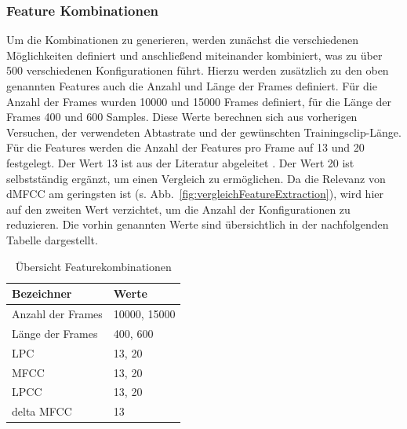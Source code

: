 
\subsubsection{Feature Kombinationen}\label{sec:FeatureKombination}

Um die Kombinationen zu generieren, werden zunächst die verschiedenen Möglichkeiten definiert und anschließend miteinander kombiniert, was zu über 500 verschiedenen Konfigurationen führt.
Hierzu werden zusätzlich zu den oben genannten Features auch die Anzahl und Länge der Frames definiert.
Für die Anzahl der Frames wurden 10000 und 15000 Frames definiert, für die Länge der Frames 400 und 600 Samples.
Diese Werte berechnen sich aus vorherigen Versuchen, der verwendeten Abtastrate und der gewünschten Trainingsclip-Länge.
Für die Features werden die Anzahl der Features pro Frame auf 13 und 20 festgelegt.
Der Wert 13 ist aus der Literatur abgeleitet \autocite[vgl.][S. 69]{valerio_velardo_mel-frequency_2020}.
Der Wert 20 ist selbstständig ergänzt, um einen Vergleich zu ermöglichen.
Da die Relevanz von \ac{dMFCC} am geringsten ist (s. Abb.~\ref{fig:vergleichFeatureExtraction}), wird hier auf den zweiten Wert verzichtet, um die Anzahl der Konfigurationen zu reduzieren.
Die vorhin genannten Werte sind übersichtlich in der nachfolgenden Tabelle dargestellt.
\begin{table}[H]
    \centering
    \begin{tabular}{l|l}
        \textbf{Bezeichner} & \textbf{Werte}   \\ \hline
        Anzahl der Frames   & 10000, 15000 \\ \hline
        Länge der Frames    & 400, 600     \\ \hline
        LPC                 & 13, 20       \\ \hline
        MFCC                & 13, 20       \\ \hline
        LPCC                & 13, 20       \\ \hline
        delta MFCC          & 13          
    \end{tabular}
    \caption{Übersicht Featurekombinationen}
\end{table}

